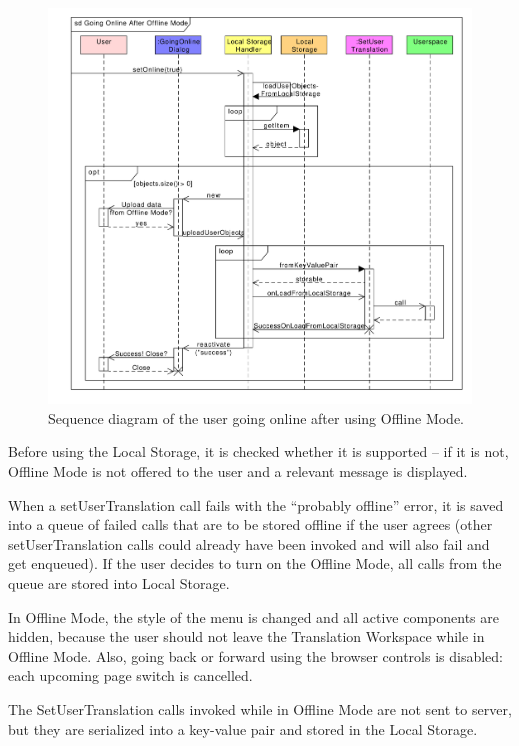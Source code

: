 \begin{figure}[h]
\begin{center}
\includegraphics[scale=0.55]{figures/offline_mode_2.pdf}
\end{center}
\caption{Sequence diagram of the user going online after using Offline Mode.}\label{gui:sd:offline_mode_2}
\end{figure}

Before using the Local Storage, it is checked whether it is supported -- if it is not, Offline Mode is not offered to the user and a relevant message is displayed.

When a setUserTranslation call fails with the ``probably offline'' error, it is saved into a queue of failed calls that are to be stored offline if the user agrees (other setUserTranslation calls could already have been invoked and will also fail and get enqueued). If the user decides to turn on the Offline Mode, all calls from the queue are stored into Local Storage.

In Offline Mode, the style of the menu is changed and all active components are hidden, because the user should not leave the Translation Workspace while in Offline Mode. Also, going back or forward using the browser controls is disabled: each upcoming page switch is cancelled.

The SetUserTranslation calls invoked while in Offline Mode are not sent to server, but they are serialized into a key-value pair and stored in the Local Storage.

